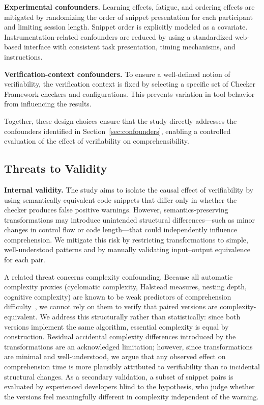 \textbf{Experimental confounders.}
Learning effects, fatigue, and ordering effects are mitigated by randomizing the order of snippet presentation for each participant and limiting session length. Snippet order is explicitly modeled as a covariate. Instrumentation-related confounders are reduced by using a standardized web-based interface with consistent task presentation, timing mechanisms, and instructions.

\textbf{Verification-context confounders.}
To ensure a well-defined notion of verifiability, the verification context is fixed by selecting a specific set of Checker Framework checkers and configurations. This prevents variation in tool behavior from influencing the results.

Together, these design choices ensure that the study directly addresses the confounders identified in Section~\ref{sec:confounders}, enabling a controlled evaluation of the effect of verifiability on comprehensibility.

\subsection{Threats to Validity}
\label{sec:threats}

\textbf{Internal validity.}
The study aims to isolate the causal effect of verifiability by using semantically equivalent code snippets that differ only in whether the checker produces false positive warnings. However, semantics-preserving transformations may introduce unintended structural differences---such as minor changes in control flow or code length---that could independently influence comprehension. We mitigate this risk by restricting transformations to simple, well-understood patterns and by manually validating input--output equivalence for each pair.

A related threat concerns complexity confounding. Because all automatic complexity proxies (cyclomatic complexity, Halstead measures, nesting depth, cognitive complexity) are known to be weak predictors of comprehension difficulty~\cite{FeldmanKC2023}, we cannot rely on them to verify that paired versions are complexity-equivalent. We address this structurally rather than statistically: since both versions implement the same algorithm, essential complexity is equal by construction. Residual accidental complexity differences introduced by the transformations are an acknowledged limitation; however, since transformations are minimal and well-understood, we argue that any observed effect on comprehension time is more plausibly attributed to verifiability than to incidental structural changes. As a secondary validation, a subset of snippet pairs is evaluated by experienced developers blind to the hypothesis, who judge whether the versions feel meaningfully different in complexity independent of the warning.

